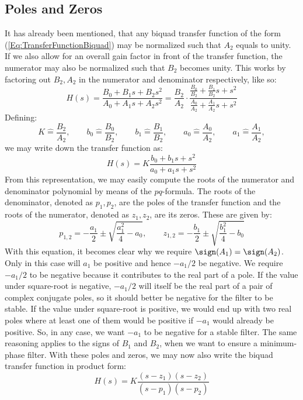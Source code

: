 \subsection{Poles and Zeros}
It has already been mentioned, that any biquad transfer function of the form (\ref{Eq:TransferFunctionBiquad}) may be normalized such that $A_2$ equals to unity. If we also allow for an overall gain factor in front of the transfer function, the numerator may also be normalized such that $B_2$ becomes unity. This works by factoring out $B_2, A_2$ in the numerator and denominator respectively, like so:
\begin{equation}
 H(s) = \frac{B_0 + B_1 s + B_2 s^2}{A_0 + A_1 s + A_2 s^2}
      = \frac{B_2}{A_2} \cdot \frac{ \frac{B_0}{B_2} + \frac{B_1}{B_2} s + s^2}
                                   { \frac{A_0}{A_2} + \frac{A_1}{A_2} s + s^2}
\end{equation}
Defining:
\begin{equation}
 K   \hat{=} \frac{B_2}{A_2}, \qquad 
 b_0 \hat{=} \frac{B_0}{B_2}, \qquad b_1 \hat{=} \frac{B_1}{B_2}, \qquad 
 a_0 \hat{=} \frac{A_0}{A_2}, \qquad a_1 \hat{=} \frac{A_1}{A_2},
\end{equation}
we may write down the transfer function as:
\begin{equation}
 H(s) = K \frac{ b_0 + b_1 s + s^2}{ a_0 + a_1 s + s^2}
\end{equation}
From this representation, we may easily compute the roots of the numerator and denominator polynomial by means of the $pq$-formula. The roots of the denominator, denoted as $p_1, p_2$, are the poles of the transfer function and the roots of the numerator, denoted as $z_1, z_2$, are its zeros. These are given by:
\begin{equation}
\label{Eq:PolesAndZeros}
 p_{1,2} = -\frac{a_1}{2} \pm \sqrt{ \frac{a_1^2}{4}-a_0}, \qquad
 z_{1,2} = -\frac{b_1}{2} \pm \sqrt{ \frac{b_1^2}{4}-b_0}
\end{equation}
With this equation, it becomes clear why we require $\sign(A_1) = \sign(A_2)$. Only in this case will $a_1$ be positive and hence $-a_1/2$ be negative. We require $-a_1/2$ to be negative because it contributes to the real part of a pole. If the value under square-root is negative, $-a_1/2$ will itself be the real part of a pair of complex conjugate poles, so it should better be negative for the filter to be stable. If the value under square-root is positive, we would end up with two real poles where at least one of them would be positive if $-a_1$ would already be positive. So, in any case, we want $-a_1$ to be negative for a stable filter. The same reasoning applies to the signs of $B_1$ and $B_2$, when we want to ensure a minimum-phase filter. With these poles and zeros, we may now also write the biquad transfer function in product form:
\begin{equation}
\label{Eq:TransferFunctionBiquadProductForm}
 H(s) = K \frac{(s-z_1)(s-z_2)}{(s-p_1)(s-p_2)}
\end{equation}


